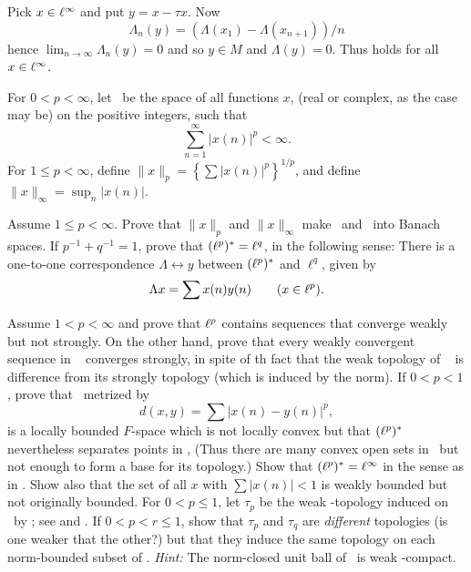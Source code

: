 \begin{enumerate}
Pick \(x\in \ell^\infty\) and put \(y = x - \tau x\). Now
\begin{equation*}
\Lambda_n(y) = \left(\Lambda(x_1) - \Lambda(x_{n+1})\right)/n
\end{equation*}
hence \(\lim_{n\to\infty} \Lambda_n(y) = 0\)
and so \(y\in M\) and \(\Lambda(y) = 0\).
Thus  holds for all \(x\in\ell^\infty\).


\begin{excopy}
For \(0<p<\infty\), let \ellp\ be the space of all functions $x$,
(real or complex, as the case may be) on the positive integers, such that
\begin{equation*}
\sum_{n=1}^\infty |x(n)|^p < \infty.
\end{equation*}
For \(1\leq p<\infty\), define \(\|x\|_p = \left\{\sum|x(n)|^p\right\}^{1/p}\),
and define \(\|x\|_\infty = \sup_n|x(n)|\).

\begin{itemize}
Assume \(1\leq p<\infty\). Prove that \(\|x\|_p\) and \(\|x\|_\infty\)
make \ellp\ and \ellinf\ into Banach spaces.
If \(p^{-1} + q^{-1} = 1\), prove that \((\ell^p)^* = \ell^q\), in the following
sense: There is a one-to-one correspondence \(\Lambda \leftrightarrow y\)
between \((\ell^p)^*\) and \(\ell^q\), given by
\begin{equation*}
\Lambda x = \sum x(n)y(n) \qquad (x\in \ell^p).
\end{equation*}

Assume \(1< p<\infty\) and prove that \(\ell^p\) contains sequences that
converge weakly but not strongly.
On the other hand, prove that every weakly convergent sequence in \ellone\ %
converges strongly, in spite of th fact that the weak topology of \ellone\ %
is difference from its strongly topology (which is induced by the norm).
If \(0<p<1\), prove that \ellp\ metrized by
\begin{equation*}
d(x,y) = \sum |x(n) - y(n)|^p,
\end{equation*}
is a locally bounded $F$-space which is not locally convex
but that \((\ell^p)^*\) nevertheless separates points in \ellp,
(Thus there are many convex open sets in \ellp\ but not enough to form a base
for its topology.)
Show that \((\ell^p)^* = \ell^\infty\) in the sense as in .
Show also that the set of all $x$ with \(\sum|x(n)|<1\)
is weakly bounded but not originally bounded.
For \(0<p\leq 1\), let \(\tau_p\) be the weak \upstar-topology
induced on \ellinf\ by \ellp; see  and .
If \(0<p<r\leq 1\), show that \(\tau_p\) and \(\tau_q\) are \emph{different}
topologies (is one weaker that the other?)
but that they induce the same topology on each norm-bounded subset of \ellinf.
\emph{Hint:} The norm-closed unit ball of \ellinf\ is weak \upstar-compact.
\end{itemize}
\end{excopy}


\end{enumerate}
